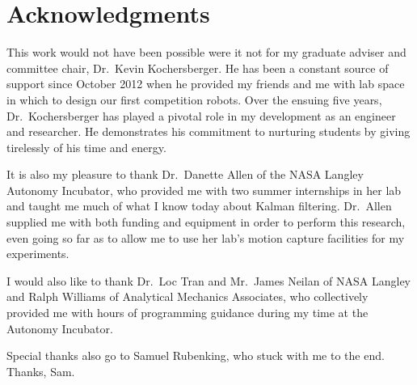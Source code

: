 \chapter*{Acknowledgments}

This work would not have been possible were it not for my graduate adviser and committee chair, Dr.~Kevin Kochersberger. He has been a constant source of support since October 2012 when he provided my friends and me with lab space in which to design our first competition robots. Over the ensuing five years, Dr.~Kochersberger has played a pivotal role in my development as an engineer and researcher. He demonstrates his commitment to nurturing students by giving tirelessly of his time and energy.

It is also my pleasure to thank Dr.~Danette Allen of the NASA Langley Autonomy Incubator, who provided me with two summer internships in her lab and taught me much of what I know today about Kalman filtering. Dr.~Allen supplied me with both funding and equipment in order to perform this research, even going so far as to allow me to use her lab's motion capture facilities for my experiments.

I would also like to thank Dr.~Loc Tran and Mr.~James Neilan of NASA Langley and Ralph Williams of Analytical Mechanics Associates, who collectively provided me with hours of programming guidance during my time at the Autonomy Incubator.

Special thanks also go to Samuel Rubenking, who stuck with me to the end. Thanks, Sam.